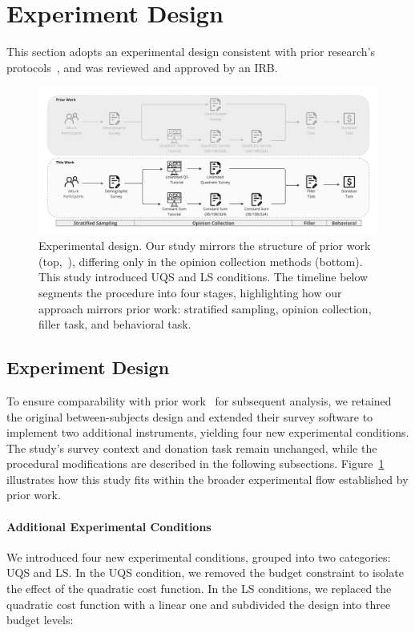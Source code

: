 \section{Experiment Design}
\label{sec:experiment}
This section adopts an experimental design consistent with prior research's protocols~\cite{chengCanShowWhat2021}, and was reviewed and approved by an IRB.

\begin{figure}[t]
    \centering
    \includegraphics[width=\textwidth]{content/image/whyqs_exp_flow.pdf}
    \caption{Experimental design. Our study mirrors the structure of prior work (top,~\cite{chengCanShowWhat2021}), differing only in the opinion collection methods (bottom). This study introduced UQS and LS conditions. The timeline below segments the procedure into four stages, highlighting how our approach mirrors prior work: stratified sampling, opinion collection, filler task, and behavioral task.}
    \label{fig:experiment}
\end{figure}

\subsection{Experiment Design}
To ensure comparability with prior work~\cite{chengCanShowWhat2021} for subsequent analysis, we retained the original between-subjects design and extended their survey software to implement two additional instruments, yielding four new experimental conditions. The study's survey context and donation task remain unchanged, while the procedural modifications are described in the following subsections. Figure~\ref{fig:experiment} illustrates how this study fits within the broader experimental flow established by prior work.

\paragraph{Additional Experimental Conditions}
We introduced four new experimental conditions, grouped into two categories: UQS and LS. In the UQS condition, we removed the budget constraint to isolate the effect of the quadratic cost function. In the LS conditions, we replaced the quadratic cost function with a linear one and subdivided the design into three budget levels:

